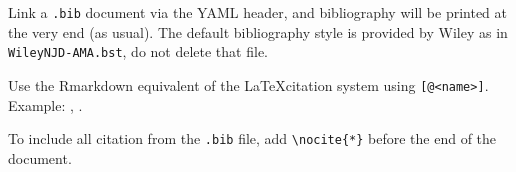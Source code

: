 \documentclass[Royal,times,sageh]{sagej}
\begin{document}
Link a \texttt{.bib} document via the YAML header, and bibliography will
be printed at the very end (as usual). The default bibliography style is
provided by Wiley as in \texttt{WileyNJD-AMA.bst}, do not delete that
file.

Use the Rmarkdown equivalent of the \LaTeX citation system using
\texttt{{[}@\textless{}name\textgreater{}{]}}. Example:
\citep{Taylor1937}, \citep{Knupp1999, Kamm2000}.

To include all citation from the \texttt{.bib} file, add
\texttt{\textbackslash{}nocite\{*\}} before the end of the document.



\end{document}
